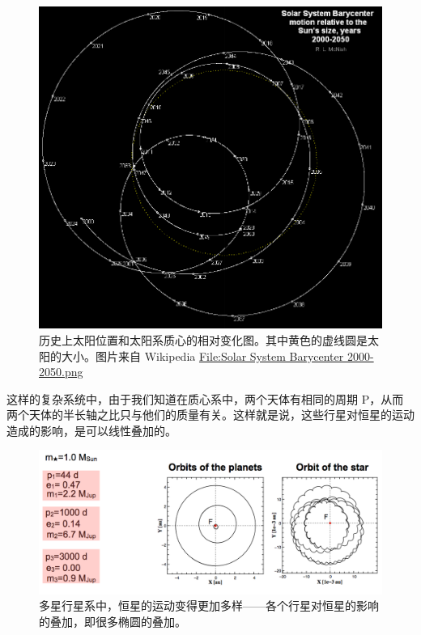 \documentclass[letterpaper,10pt,english]{sphinxmanual}
\begin{document}
\begin{figure}[htbp]
\centering
\capstart

\includegraphics{Solar_System_Barycenter_2000-2050.png}
\caption{历史上太阳位置和太阳系质心的相对变化图。其中黄色的虚线圆是太阳的大小。图片来自 Wikipedia \href{http://en.wikiversity.org/wiki/File:Solar\_System\_Barycenter\_2000-2050.png}{File:Solar System Barycenter 2000-2050.png}}\end{figure}

这样的复杂系统中，由于我们知道在质心系中，两个天体有相同的周期 P，从而两个天体的半长轴之比只与他们的质量有关。这样就是说，这些行星对恒星的运动造成的影响，是可以线性叠加的。
\begin{figure}[htbp]
\centering
\capstart

\includegraphics{multiplanets.png}
\caption{多星行星系中，恒星的运动变得更加多样——各个行星对恒星的影响的叠加，即很多椭圆的叠加。}\end{figure}
\end{document}

